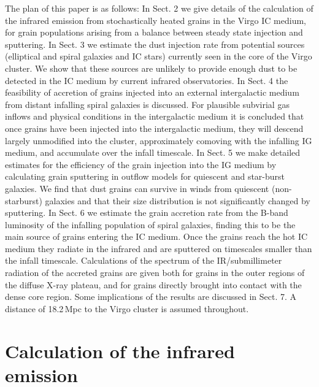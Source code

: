 \documentclass[]{aa}
\begin{document}
The plan of this paper is as follows: In Sect. 2 we give details of the 
calculation of the infrared emission from stochastically heated
grains in the Virgo IC medium, for grain populations arising from 
a balance between steady state injection and sputtering.
In Sect. 3 we estimate the dust injection rate from potential sources 
(elliptical and spiral galaxies and IC stars) currently seen
in the core of the Virgo cluster. We show that these 
sources are unlikely to provide enough dust to be detected in the IC medium by
current infrared observatories. In Sect. 4 the feasibility of accretion of
grains injected into an external
intergalactic medium from distant infalling spiral galaxies is discussed.
For plausible subvirial gas inflows and physical 
conditions in the intergalactic medium it is concluded that once grains
have been injected into the intergalactic medium, they will descend largely 
unmodified
into the cluster, approximately comoving with the infalling IG medium, and
accumulate over the infall timescale. In Sect. 5 we make detailed
estimates for the efficiency of the grain injection into the IG medium 
by calculating grain sputtering in outflow models for quiescent and star-burst
galaxies. We find that dust grains can survive in winds from quiescent 
(non-starburst) galaxies and that their size distribution is 
not significantly changed by sputtering.
In Sect. 6 we estimate the grain accretion rate from the B-band luminosity
of the infalling population of spiral galaxies, finding this to be the main
source of grains entering the IC medium. Once the
grains reach the hot IC medium they radiate in the 
infrared and are sputtered on timescales smaller than the infall timescale. 
Calculations of the spectrum of the
IR/submillimeter radiation of the accreted grains are given both for grains 
in the outer regions of the diffuse X-ray plateau, and for 
grains directly brought into contact with the dense core region.
Some implications of the results are discussed in Sect. 7.
A distance of 18.2$\,$Mpc to the Virgo cluster is assumed throughout.


\section{Calculation of the infrared emission}
\end{document}
